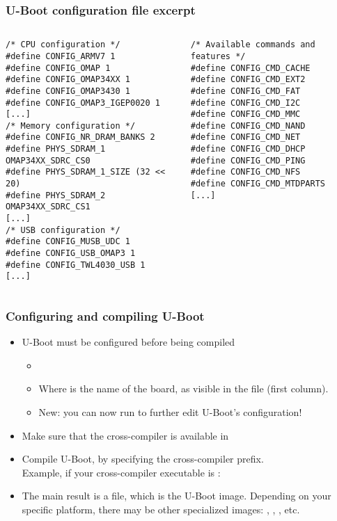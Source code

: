 \begin{frame}[fragile]
  \frametitle{U-Boot configuration file excerpt}
  \begin{columns}
    \scriptsize
\begin{verbatim}
/* CPU configuration */
#define CONFIG_ARMV7 1
#define CONFIG_OMAP 1
#define CONFIG_OMAP34XX 1
#define CONFIG_OMAP3430 1
#define CONFIG_OMAP3_IGEP0020 1
[...]
/* Memory configuration */
#define CONFIG_NR_DRAM_BANKS 2
#define PHYS_SDRAM_1 OMAP34XX_SDRC_CS0
#define PHYS_SDRAM_1_SIZE (32 <<  20)
#define PHYS_SDRAM_2 OMAP34XX_SDRC_CS1
[...]
/* USB configuration */
#define CONFIG_MUSB_UDC 1
#define CONFIG_USB_OMAP3 1
#define CONFIG_TWL4030_USB 1
[...]
\end{verbatim}
    \scriptsize
\begin{verbatim}
/* Available commands and features */
#define CONFIG_CMD_CACHE
#define CONFIG_CMD_EXT2
#define CONFIG_CMD_FAT
#define CONFIG_CMD_I2C
#define CONFIG_CMD_MMC
#define CONFIG_CMD_NAND
#define CONFIG_CMD_NET
#define CONFIG_CMD_DHCP
#define CONFIG_CMD_PING
#define CONFIG_CMD_NFS
#define CONFIG_CMD_MTDPARTS
[...]
\end{verbatim}
  \end{columns}
\end{frame}

\begin{frame}
  \frametitle{Configuring and compiling U-Boot}
  \begin{itemize}
  \item U-Boot must be configured before being compiled
    \begin{itemize}
    \item {}
    \item Where  is the name of the board, as visible
      in the  file (first column).
    \item New: you can now run  to further
      edit U-Boot's configuration!
    \end{itemize}
  \item Make sure that the cross-compiler is available in 
  \item Compile U-Boot, by specifying the cross-compiler prefix.\\
    Example, if your cross-compiler executable is :\\
  \item The main result is a  file, which is the
    U-Boot image. Depending on your specific platform, there may be
    other specialized images: , ,
    , etc.
  \end{itemize}
\end{frame}


